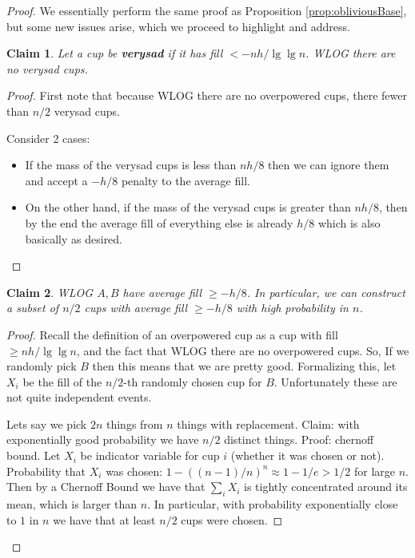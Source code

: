 \documentclass[twocolumn]{article}[11pt]
\newcommand{\defn}[1]{{\textit{\textbf{\boldmath #1}}}}
\newtheorem{clm}{Claim}
\begin{document}
\begin{proof}
  We essentially perform the same proof as Proposition \ref{prop:obliviousBase}, but some new issues arise, which we proceed to highlight and address. 

\begin{clm}
  Let a cup be \defn{verysad} if it has fill $< -nh/\lg\lg n$.
  WLOG there are no verysad cups. 
\end{clm}
\begin{proof}
  First note that because WLOG there are no overpowered cups, there fewer than $n/2$ verysad cups.

  Consider 2 cases:
  \begin{itemize}
    \item If the mass of the verysad cups is less than $nh/8$ then we can
      ignore them and accept a $-h/8$ penalty to the average fill.
    \item On the other hand, if the mass of the verysad cups is greater than
      $nh/8$, then by the end the average fill of everything else is already
      $h/8$ which is also basically as desired.
  \end{itemize}
\end{proof}

\begin{clm}
  WLOG $A,B$ have average fill $\ge -h/8$.
  In particular, we can construct a subset of $n/2$
  cups with average fill $\ge -h/8$ with high probability in $n$. 
\end{clm}
\begin{proof}

  Recall the definition of an overpowered cup as a cup with fill $\ge nh / \lg \lg n$,
  and the fact that WLOG there are no overpowered cups.
  So, If we randomly pick $B$ then this means that we are pretty good. 
  Formalizing this, let $X_i$ be the fill of the $n/2$-th randomly chosen cup
  for $B$. Unfortunately these are not quite independent events.

  Lets say we pick $2n$ things from $n$ things with replacement. Claim: with
  exponentially good probability we have $n/2$ distinct things. 
  Proof: chernoff bound. Let $X_i$ be indicator variable for cup $i$ (whether
  it was chosen or not). Probability that $X_i$ was chosen: $1-((n-1)/n)^n
  \approx 1-1/e > 1/2$ for large $n$. 
  Then by a Chernoff Bound we have that $\sum_i X_i$ is tightly concentrated
  around its mean, which is larger than $n$. In particular, with probability
  exponentially close to $1$ in $n$ we have that at least $n/2$ cups were chosen.


\end{proof}
\end{proof}
\end{document}
